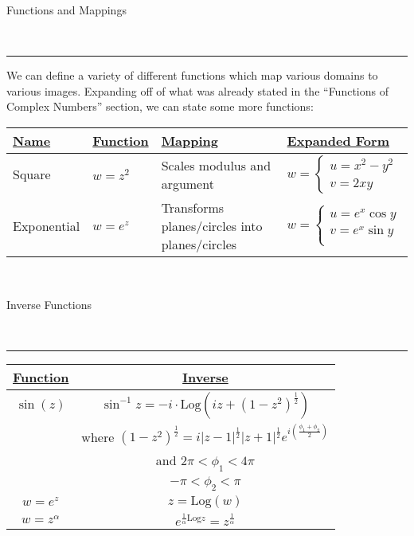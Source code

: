\documentclass{article}
\newcommand{\header}[1]{\begin{large}\noindent #1\end{large}\\\rule{\textwidth}{0.5pt}}
\newcommand{\gap}{\medskip\\}
\newcommand{\Log}{\textrm{Log}}
\begin{document}
    \header{Functions and Mappings}

    We can define a variety of different functions which map various domains to 
    various images. Expanding off of what was already stated in the ``Functions of
    Complex Numbers'' section, we can state some more functions:
    \gap
    \bgroup
    \def\arraystretch{1.5}%
    \begin{tabular}{ |l|l|l|l| } 
        \hline
        \underline{Name} & \underline{Function} & \underline{Mapping} & \underline{Expanded Form} \\
        \hline
        Square  & $w = z^2$  & Scales modulus and argument & $w = \begin{cases}
            u = x^2 - y^2\\
            v = 2xy
        \end{cases}$   \\
        \hline
        Exponential & $w = e^z$ & Transforms planes/circles into planes/circles & $w = \begin{cases}
            u = e^x \cos y\\
            v = e^x \sin y\\
        \end{cases}$  \\
        \hline
    \end{tabular}
    \egroup
    \gap
    
    \header{Inverse Functions}
    \bgroup
    \def\arraystretch{1.5}%
    \begin{tabular}{ |c|c| } 
        \hline
        \underline{Function} & \underline{Inverse} \\
        \hline
        $ \sin(z)$ & $\sin^{-1}z = -i\cdot\Log(iz + (1-z^2)^{\frac{1}{2}})$ \\
        & where $(1 - z^2)^{\frac{1}{2}} = i|z-1|^\frac{1}{2} |z + 1|^\frac{1}{2}e^{i\left(\frac{\phi_1 + \phi_2}{2}\right)} $\\
        & and $2\pi < \phi_1 < 4\pi$\\
        & $ -\pi < \phi_2 < \pi$\\
        \hline
        $w = e^z$ & $z = \Log(w)$\\
        \hline
        $w = z^\alpha$ & $e^{\frac{1}{\alpha} \Log z} = z^{\frac{1}{\alpha}}$\\
        \hline
    \end{tabular}
    \egroup
    
    
\end{document}
